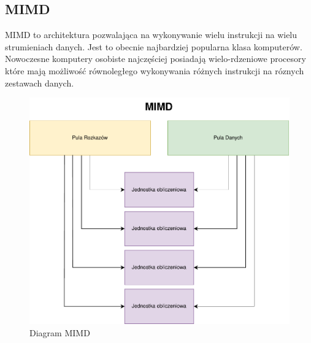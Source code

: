 \documentclass[a4paper,12pt]{book} %
\begin{document}
\subsection {MIMD}
MIMD to architektura pozwalająca na wykonywanie wielu instrukcji na wielu strumieniach danych. Jest to obecnie najbardziej popularna klasa komputerów. Nowoczesne komputery osobiste najczęściej posiadają wielo-rdzeniowe procesory które mają możliwość równoległego wykonywania różnych instrukcji na róznych zestawach danych.
\begin{figure}[h]
	\centering
	\includegraphics[scale=0.7]{assets/MIMD.pdf}
	\caption{Diagram MIMD}
	\label{MIMD}
\end{figure}

\newpage
\end{document}
